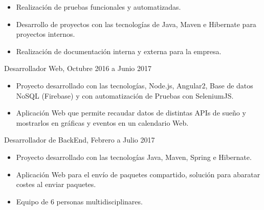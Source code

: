 \documentclass[10pt,a4paper,ragged2e]{altacv}
\begin{document}
\divider

\begin{itemize}
\item Realización de pruebas funcionales y automatizadas. 
\item Desarrollo de proyectos con las tecnologías de Java, Maven e Hibernate para proyectos internos. 
\item Realización de documentación interna y externa para la empresa. 
\end{itemize}


{Desarrollador Web, Octubre 2016 a Junio 2017}{}{}
\begin{itemize}
\item Proyecto desarrollado con las tecnologías, Node.js, Angular2, Base de
datos NoSQL (Firebase) y con automatización de Pruebas con
SeleniumJS.
\item Aplicación Web que permite recaudar datos de distintas APIs de sueño
y mostrarlos en gráficas y eventos en un calendario Web.
\end{itemize}

\divider

{Desarrollador de BackEnd, Febrero a Julio 2017}{}{}
\begin{itemize}
\item Proyecto desarrollado con las tecnologías Java, Maven, Spring e
Hibernate.
\item Aplicación Web para el envío de paquetes compartido, solución para
abaratar costes al enviar paquetes.
\item Equipo de 6 personas multidisciplinares.
\end{itemize}
\end{document}
